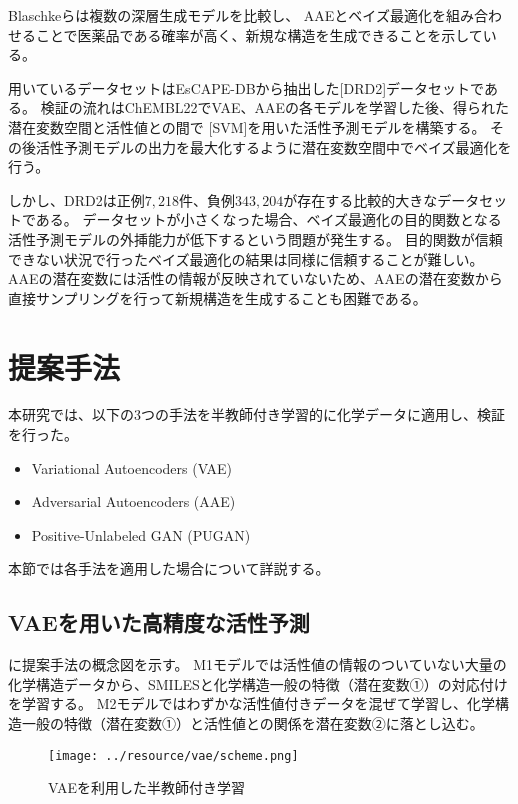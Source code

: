 Blaschkeらは複数の深層生成モデルを比較し、
AAEとベイズ最適化を組み合わせることで医薬品である確率が高く、新規な構造を生成できることを示している\cite{Blaschke2018}。

用いているデータセットはEsCAPE-DBから抽出した[DRD2]データセットである。
検証の流れはChEMBL22でVAE、AAEの各モデルを学習した後、得られた潜在変数空間と活性値との間で
[SVM]を用いた活性予測モデルを構築する。
その後活性予測モデルの出力を最大化するように潜在変数空間中でベイズ最適化を行う。

しかし、DRD2は正例$7,218$件、負例$343,204$が存在する比較的大きなデータセットである。
データセットが小さくなった場合、ベイズ最適化の目的関数となる活性予測モデルの外挿能力が低下するという問題が発生する。
目的関数が信頼できない状況で行ったベイズ最適化の結果は同様に信頼することが難しい。
AAEの潜在変数には活性の情報が反映されていないため、AAEの潜在変数から直接サンプリングを行って新規構造を生成することも困難である。

\section{提案手法}

本研究では、以下の3つの手法を半教師付き学習的に化学データに適用し、検証を行った。
\begin{itemize}
    \item Variational Autoencoders (VAE) \cite{Kingma2014, Doersch2016}
    \item Adversarial Autoencoders (AAE) \cite{aae}
    \item Positive-Unlabeled GAN (PUGAN) \cite{pugan}
\end{itemize}
本節では各手法を適用した場合について詳説する。

\subsection{VAEを用いた高精度な活性予測}

に提案手法の概念図を示す。
M1モデルでは活性値の情報のついていない大量の化学構造データから、SMILESと化学構造一般の特徴（潜在変数①）の対応付けを学習する。
M2モデルではわずかな活性値付きデータを混ぜて学習し、化学構造一般の特徴（潜在変数①）と活性値との関係を潜在変数②に落とし込む。
\begin{figure}[tbp]
    \centering
    \texttt{[image: ../resource/vae/scheme.png]}
    \caption{VAEを利用した半教師付き学習} \label{fig:vae_prediction_model}
\end{figure}

